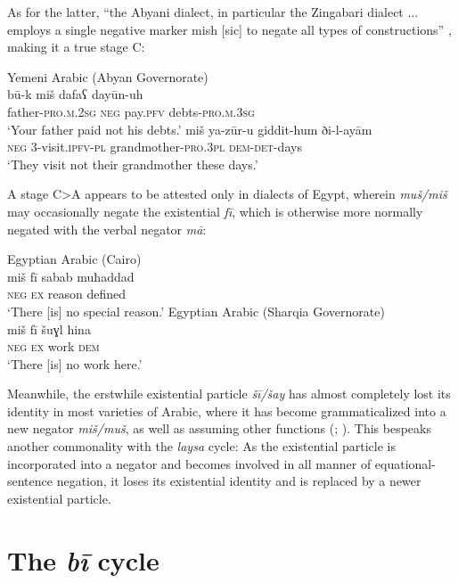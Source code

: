 \documentclass[output=paper,colorlinks,citecolor=brown]{langscibook}
\begin{document}
As for the latter, “the Abyani dialect, in particular the Zingabari dialect ... employs a single negative marker mish [sic] to negate all types of constructions” \citep[33]{ahmed2012}, making it a true stage C:

\ea Yemeni Arabic (Abyan Governorate)\label{ex:WiAR-20}\\
  \ea
  	\gll bū-k miš dafaʕ dayūn-uh\\
  	father-\textsc{pro.m.2sg} \textsc{neg} pay.\textsc{pfv} debts-\textsc{pro.m.3sg} \\
  	\glt ‘Your father paid not his debts.’ \citep[35]{ahmed2012}
  \ex
  	\gll miš ya-zūr-u giddit-hum ði-l-ayām\\
  	\textsc{neg} 3-visit.\textsc{ipfv-pl} grandmother-\textsc{pro.3pl} \textsc{dem-det}-days\\
  	\glt ‘They visit not their grandmother these days.’ \citep[38]{ahmed2012} 
\z \z

A stage C>A appears to be attested only in dialects of Egypt, wherein \textit{muš/miš} may occasionally negate the existential \textit{fī}, which is otherwise more normally negated with the verbal negator \textit{mā}:

\ea \label{ex:WiAR-21}
  \ea Egyptian Arabic (Cairo)\\
  	\gll miš fī sabab muħaddad\\
  	\textsc{neg} \textsc{ex} reason defined\\
  	\glt ‘There [is] no special reason.’ \citep[89]{doss2008a}
  \ex Egyptian Arabic (Sharqia Governorate)\\
  	\gll miš fī šuɣ⁠l hina\\
  	\textsc{neg} \textsc{ex} work \textsc{dem}\\
  	\glt ‘There [is] no work here.’ \citep[71]{h2011a}
\z \z


Meanwhile, the erstwhile existential particle \textit{šī/šay} has almost completely lost its identity in most varieties of Arabic, where it has become grammaticalized into a new negator \textit{miš/muš}, as well as assuming other functions (\citealp[chpt. 3]{wilmsen2014a}; \citealp{wilmsen2017a}). This bespeaks another commonality with the \textit{laysa} cycle: As the existential particle is incorporated into a negator and becomes involved in all manner of equational-sentence negation, it loses its existential identity and is replaced by a newer existential particle. 


\section{The \textit{bī} cycle} \label{s:WiAR-4}
\end{document}
